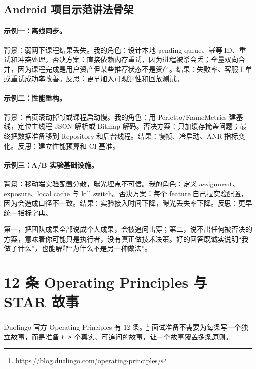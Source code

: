 \subsection{Android 项目示范讲法骨架}

\paragraph{示例一：离线同步。} 背景：弱网下课程结果丢失。我的角色：设计本地 pending queue、幂等 ID、重试和冲突处理。否决方案：直接依赖内存重试，因为进程被杀会丢；全量双向合并，因为课程完成是用户资产但某些推荐状态不是资产。结果：失败率、客服工单或重试成功率改善。反思：更早加入可观测性和回放测试。

\paragraph{示例二：性能重构。} 背景：首页滚动掉帧或课程启动慢。我的角色：用 Perfetto/FrameMetrics 建基线，定位主线程 JSON 解析或 Bitmap 解码。否决方案：只加缓存掩盖问题；最终把数据准备移到 Repository 和后台线程。结果：慢帧、冷启动、ANR 指标变化。反思：建立性能预算和 CI 基准。

\paragraph{示例三：A/B 实验基础设施。} 背景：移动端实验配置分散，曝光埋点不可信。我的角色：定义 assignment、exposure、local cache 与 kill switch。否决方案：每个 feature 自己拉实验配置，因为会造成口径不一致。结果：实验接入时间下降，曝光丢失率下降。反思：更早统一指标字典。

\begin{pitfall}[项目深挖两个致命伤]
第一，把团队成果全部说成个人成果，会被追问击穿；第二，说不出任何被否决的方案，意味着你可能只是执行者，没有真正做技术决策。好的回答既诚实说明“我做了什么”，也能解释“为什么不是另一种做法”。
\end{pitfall}

\section{12 条 Operating Principles 与 STAR 故事}

\srcofficial Duolingo 官方 Operating Principles 有 12 条。\footnote{\url{https://blog.duolingo.com/operating-principles/}} 面试准备不需要为每条写一个独立故事，而是准备 6--8 个真实、可追问的故事，让一个故事覆盖多条原则。

